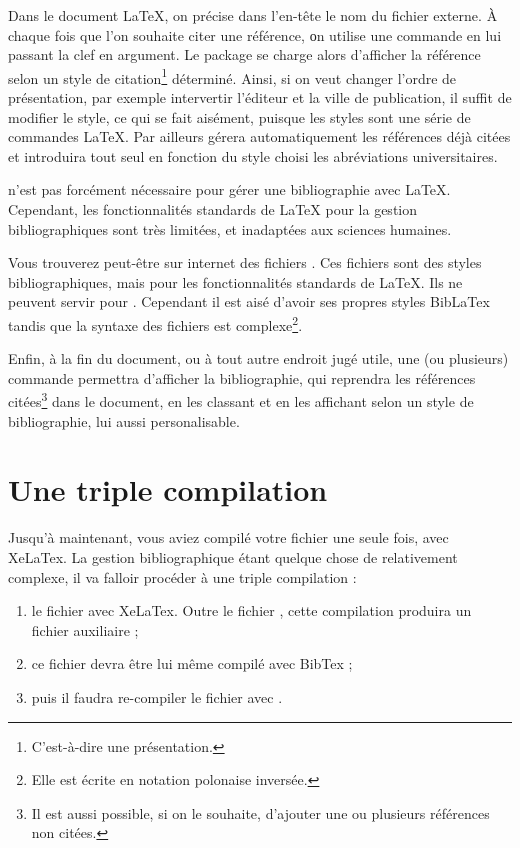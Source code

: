 Dans le document \LaTeX{}, on précise dans l'en-tête le nom du fichier externe. À chaque fois que l'on souhaite citer une référence, οn utilise une commande en lui passant la clef en argument. Le package  se charge alors d'afficher la référence selon un style de citation\footnote{C’est-à-dire une présentation.} déterminé. Ainsi, si on veut changer l'ordre de présentation, par exemple intervertir l'éditeur et la ville de publication, il suffit de modifier le style, ce qui se fait aisément, puisque les styles sont une série de commandes \LaTeX{}. Par ailleurs  gérera automatiquement les références déjà citées et introduira tout seul en fonction du style choisi les abréviations universitaires. 

\begin{plusloins}

 n'est pas forcément nécessaire pour gérer une bibliographie avec \LaTeX{}. Cependant, les fonctionnalités standards de LaTeX pour la gestion bibliographiques sont très limitées, et inadaptées aux sciences humaines. 

Vous trouverez peut-être sur internet des fichiers . Ces fichiers sont des styles bibliographiques, mais pour les fonctionnalités standards de \LaTeX{}. Ils ne peuvent servir pour . Cependant il est aisé d'avoir ses propres styles BibLaTex tandis que la syntaxe des fichiers  est complexe\footnote{Elle est écrite en notation polonaise inversée.}.

\end{plusloins}

Enfin, à la fin du document, ou à tout autre endroit jugé utile, une (ou plusieurs) commande permettra d'afficher la bibliographie, qui reprendra les références citées\footnote{Il est aussi possible, si on le souhaite, d'ajouter une ou plusieurs références non citées.} dans le document, en les classant et en les affichant selon un style de bibliographie, lui aussi personalisable.

\section{Une triple compilation}\label{3compil}

Jusqu'à maintenant, vous aviez compilé votre fichier  une seule fois, avec XeLaTex. La gestion bibliographique étant quelque chose de relativement complexe, il va falloir procéder à une triple compilation :
\begin{enumerate}
\item le fichier  avec XeLaTex. Outre le fichier , cette compilation produira un fichier auxiliaire  ;
\item ce fichier devra être lui même compilé avec BibTex ;
\item puis il faudra re-compiler le fichier  avec \XeLaTeX.
\end{enumerate}

